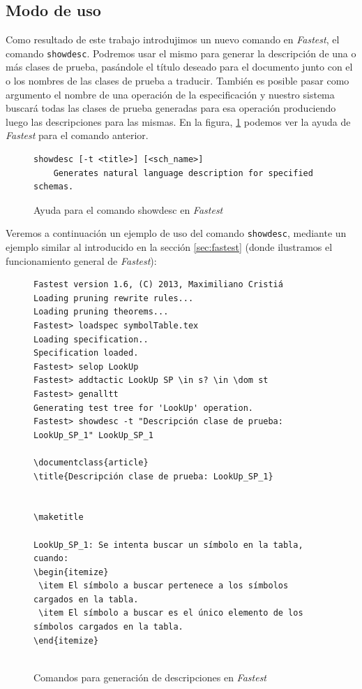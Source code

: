 \subsection{Modo de uso}

Como resultado de este trabajo introdujimos un nuevo comando en \textit{Fastest}, el comando \texttt{showdesc}. Podremos usar el mismo para generar la descripción de una o más clases de prueba, pasándole el título deseado para el documento junto con el o los nombres de las clases de prueba a traducir. También es posible pasar como argumento el nombre de una operación de la especificación y nuestro sistema buscará todas las clases de prueba generadas para esa operación produciendo luego las descripciones para las mismas. En la figura, \ref{ej:showdesc_fastest} podemos ver la ayuda de \textit{Fastest} para el comando anterior.

\begin{figure}[H]
\centering
\begin{Verbatim}[frame=single,fontsize=\scriptsize]
showdesc [-t <title>] [<sch_name>]
	Generates natural language description for specified schemas.
\end{Verbatim}
\caption{Ayuda para el comando showdesc en \emph{Fastest}}
\label{ej:showdesc_fastest}
\end{figure}

Veremos a continuación un ejemplo de uso del comando \texttt{showdesc}, mediante un ejemplo similar al introducido en la sección \ref{sec:fastest} (donde ilustramos el funcionamiento general de \textit{Fastest}):

\begin{figure}[H]
\centering
\begin{Verbatim}[frame=single,fontsize=\scriptsize]
Fastest version 1.6, (C) 2013, Maximiliano Cristiá
Loading pruning rewrite rules...
Loading pruning theorems...
Fastest> loadspec symbolTable.tex
Loading specification..
Specification loaded.
Fastest> selop LookUp
Fastest> addtactic LookUp SP \in s? \in \dom st      
Fastest> genalltt
Generating test tree for 'LookUp' operation.
Fastest> showdesc -t "Descripción clase de prueba: LookUp_SP_1" LookUp_SP_1 

\documentclass{article}
\title{Descripción clase de prueba: LookUp_SP_1}


\maketitle

LookUp_SP_1: Se intenta buscar un símbolo en la tabla, cuando:
\begin{itemize}
 \item El símbolo a buscar pertenece a los símbolos cargados en la tabla.
 \item El símbolo a buscar es el único elemento de los símbolos cargados en la tabla.
\end{itemize}


\end{Verbatim}
\caption{Comandos para generación de descripciones en \emph{Fastest}}
\label{ej:comandos_fastest_nlg}
\end{figure}


